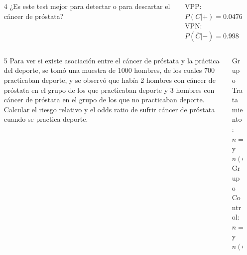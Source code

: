 \documentclass[aspectratio=169,10pt,t]{beamer}
\begin{document}
\begin{frame}
\begin{columns}
\begin{column}[T]{0.70\textwidth}
\begin{enumerate}
\item[4] ¿Es este test mejor para detectar o para descartar el cáncer de próstata?
\end{enumerate}
\end{column}
\begin{column}[T]{0.30\textwidth}
\begin{datos}
VPP: $P(C|+) = 0.0476$\\
VPN: $P(\overline C|-) = 0.998$
\end{datos}
\end{column}
\end{columns}
\end{frame}

\begin{frame}
\begin{columns}
\begin{column}[T]{0.70\textwidth}
\begin{enumerate}
\item[5] Para ver si existe asociación entre el cáncer de próstata y la práctica del deporte, se tomó una muestra de 1000 hombres, de los cuales 700 practicaban deporte, y se observó que había 2 hombres con cáncer de próstata en el grupo de los que practicaban deporte y 3 hombres con cáncer de próstata en el grupo de los que no practicaban deporte. Calcular el riesgo relativo y el odds ratio de sufrir cáncer de próstata cuando se practica deporte. 
\end{enumerate}
\end{column}
\begin{column}[T]{0.30\textwidth}
\begin{datos}
Grupo Tratamiento:\\
$n=700$ y $n(C)=2$\\
Grupo Control:\\
$n=300$ y $n(C)=3$
\end{datos}
\end{column}
\end{columns}
\end{frame}
\end{document}
